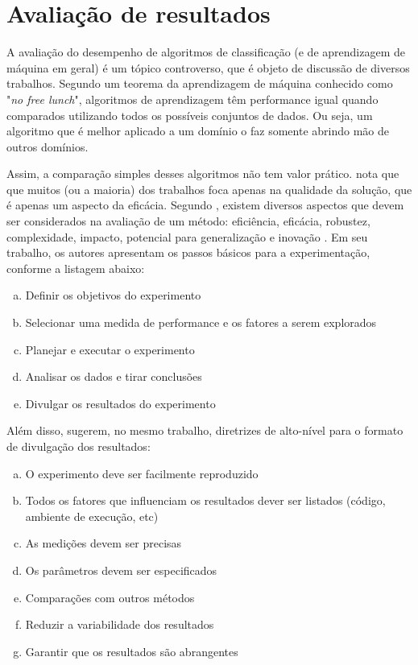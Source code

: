 \chapter{Avaliação de resultados}
\label{chap:eval}

A avaliação do desempenho de algoritmos de classificação (e de aprendizagem de máquina em geral) é um tópico controverso, que é objeto de discussão de diversos trabalhos. Segundo um teorema da aprendizagem de máquina conhecido como "\emph{no free lunch}", algoritmos de aprendizagem têm performance igual quando comparados utilizando todos os possíveis conjuntos de dados. Ou seja, um algoritmo que é melhor aplicado a um domínio o faz somente abrindo mão de outros domínios.

Assim, a comparação simples desses algoritmos não tem valor prático. \citeauthor{Brownlee2007} nota que que muitos (ou a maioria) dos trabalhos foca apenas na qualidade da solução, que é apenas um aspecto da eficácia. Segundo \citeauthor{Barr1995}, existem diversos aspectos que devem ser considerados na avaliação de um método: eficiência, eficácia, robustez, complexidade, impacto, potencial para generalização e inovação \cite{Barr1995}. Em seu trabalho, os autores apresentam os passos básicos para a experimentação, conforme a listagem abaixo:

\begin{enumerate}[a)]
    \item Definir os objetivos do experimento
    \item Selecionar uma medida de performance e os fatores a serem explorados
    \item Planejar e executar o experimento
    \item Analisar os dados e tirar conclusões
    \item Divulgar os resultados do experimento
\end{enumerate}

Além disso, sugerem, no mesmo trabalho, diretrizes de alto-nível para o formato de divulgação dos resultados:

\begin{enumerate}[a)]
    \item O experimento deve ser facilmente reproduzido
    \item Todos os fatores que influenciam os resultados dever ser listados (código, ambiente de execução, etc)
    \item As medições devem ser precisas
    \item Os parâmetros devem ser especificados
    \item Comparações com outros métodos
    \item Reduzir a variabilidade dos resultados
    \item Garantir que os resultados são abrangentes
\end{enumerate}

